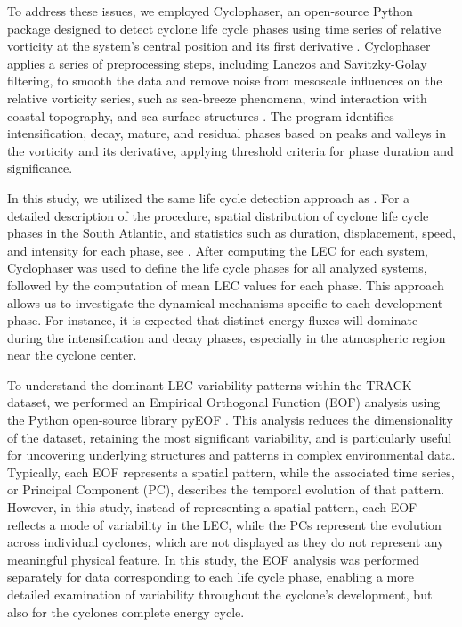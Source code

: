 \documentclass[pdflatex,sn-chicago]{sn-jnl}%
\theoremstyle{plain}
\theoremstyle{definition}
\theoremstyle{remark}
\theoremstyle{definition}
\begin{document}
To address these issues, we employed Cyclophaser, an open-source Python package designed to detect cyclone life cycle phases using time series of relative vorticity at the system's central position and its first derivative \citep{deSouza2024CycloPhaser}. Cyclophaser applies a series of preprocessing steps, including Lanczos \citep{duchon1979lanczos} and Savitzky-Golay \citep{savitzky1964smoothing} filtering, to smooth the data and remove noise from mesoscale influences on the relative vorticity series, such as sea-breeze phenomena, wind interaction with coastal topography, and sea surface structures \citep[e.g.][]{steele2015modelling,da2017shallow,acevedo2010atmospheric}. The program identifies intensification, decay, mature, and residual phases based on peaks and valleys in the vorticity and its derivative, applying threshold criteria for phase duration and significance.

In this study, we utilized the same life cycle detection approach as \citet{CycloPhaser2024}. For a detailed description of the procedure, spatial distribution of cyclone life cycle phases in the South Atlantic, and statistics such as duration, displacement, speed, and intensity for each phase, see \citet{couto2024new}. After computing the LEC for each system, Cyclophaser was used to define the life cycle phases for all analyzed systems, followed by the computation of mean LEC values for each phase. This approach allows us to investigate the dynamical mechanisms specific to each development phase. For instance, it is expected that distinct energy fluxes will dominate during the intensification and decay phases, especially in the atmospheric region near the cyclone center.

To understand the dominant LEC variability patterns within the TRACK dataset, we performed an Empirical Orthogonal Function (EOF) analysis \citep{fukuoka1951study,lorenz1956empirical} using the Python open-source library pyEOF \citep{zheng_2021}. This analysis reduces the dimensionality of the dataset, retaining the most significant variability, and is particularly useful for uncovering underlying structures and patterns in complex environmental data. Typically, each EOF represents a spatial pattern, while the associated time series, or Principal Component (PC), describes the temporal evolution of that pattern. However, in this study, instead of representing a spatial pattern, each EOF reflects a mode of variability in the LEC, while the PCs represent the evolution across individual cyclones, which are not displayed as they do not represent any meaningful physical feature. In this study, the EOF analysis was performed separately for data corresponding to each life cycle phase, enabling a more detailed examination of variability throughout the cyclone's development, but also for the cyclones complete energy cycle.
\end{document}
